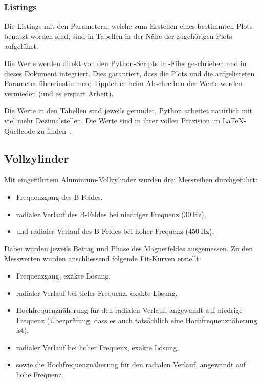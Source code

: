 \subsubsection{Listings}
\label{sec:ausw:subsec:methodik:subsubsec:listings}

Die Listings mit  den Parametern, welche zum Erstellen  eines bestimmten Plots
benutzt worden  sind, sind in Tabellen  in der N\"ahe der  zugeh\"origen Plots
aufgef\"uhrt.

Die  Werte   werden  direkt  von  den   Python-Scripts  in  -Files
geschrieben und in dieses Dokument integriert. Dies garantiert, dass die Plots
und die aufgelisteten Parameter  \"ubereinstimmen; Tippfehler beim Abschreiben
der Werte werden vermieden (und es erspart Arbeit).

Die Werte in  den Tabellen sind jeweils gerundet,  Python arbeitet nat\"urlich
mit viel  mehr Dezimalstellen. Die Werte  sind in ihrer vollen  Pr\"azision im
\LaTeX-Quellcode zu finden~\cite{ref:aw:github}.


\clearpage
\subsection{Vollzylinder}
\label{sec:ausw:subsec:hohlz}

Mit   eingef\"uhrtem   Aluminium-Vollzylinder   wurden   drei   Messreihen
durchgef\"uhrt:
\begin{itemize}
    \item
        Frequenzgang des B-Feldes,
    \item
        radialer    Verlauf    des    B-Feldes    bei    niedriger    Frequenz
        ($\SI{30}{\hertz}$),
    \item
        und    radialer   Verlauf    des   B-Feldes    bei   hoher    Frequenz
        ($\SI{450}{\hertz}$).
\end{itemize}

Dabei wurden  jeweils Betrag  und Phase  des Magnetfeldes  ausgemessen. Zu den
Messwerten wurden anschliessend folgende Fit-Kurven erstellt:
\begin{itemize}
    \item
        Frequenzgang, exakte L\"osung,
    \item
        radialer Verlauf bei tiefer Frequenz, exakte L\"osung,
    \item
        Hochfrequenzn\"aherung  f\"ur  den  radialen  Verlauf,  angewandt  auf
        niedrige Frequenz  (\"Uberpr\"ufung, dass  es auch  tats\"achlich eine
        Hochfrequenzn\"aherung ist),
    \item
        radialer Verlauf bei hoher Frequenz, exakte L\"osung,
    \item
        sowie die Hochfrequenzn\"aherung f\"ur den radialen Verlauf, angewandt
        auf hohe Frequenz.
\end{itemize}

